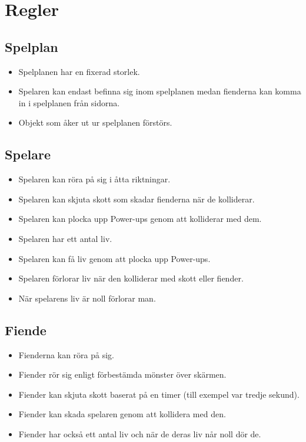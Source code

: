 \documentclass{TDP005mall}
\begin{document}
\section{Regler}
\subsection{Spelplan}
\begin{itemize}
\item Spelplanen har en fixerad storlek.
\item Spelaren kan endast befinna sig inom spelplanen medan fienderna kan komma in i spelplanen från sidorna. 
\item Objekt som åker ut ur spelplanen förstörs.
\end{itemize}

\subsection{Spelare}
\begin{itemize}
\item Spelaren kan röra på sig i åtta riktningar.
\item Spelaren kan skjuta skott som skadar fienderna när de kolliderar.
\item Spelaren kan plocka upp Power-ups genom att kolliderar med dem.
\item Spelaren har ett antal liv.
\item Spelaren kan få liv genom att plocka upp Power-ups.
\item Spelaren förlorar liv när den kolliderar med skott eller fiender.
\item När spelarens liv är noll förlorar man.

\end{itemize}

\subsection{Fiende}
\begin{itemize}
\item Fienderna kan röra på sig.
\item Fiender rör sig enligt förbestämda mönster över skärmen.
\item Fiender kan skjuta skott baserat på en timer (till exempel var tredje sekund).
\item Fiender kan skada spelaren genom att kollidera med den.
\item Fiender har också ett antal liv och när de deras liv når noll dör de.
\end{itemize}
\end{document}
